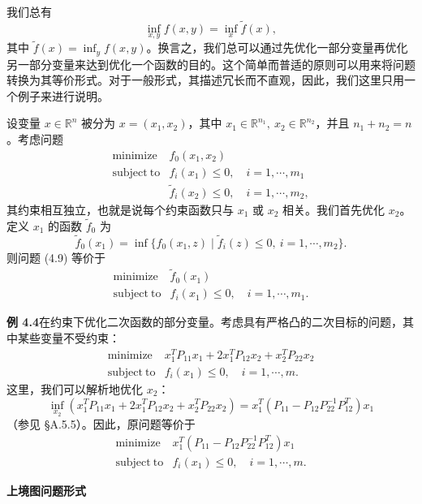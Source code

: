 \documentclass[UTF8,12pt,a4paper,fontset=fandol]{ctexart}
\begin{document}
我们总有
\[
\inf_{x,y} f(x,y)=\inf_x \tilde{f}(x),
\]
其中 $\tilde{f}(x)=\inf_y f(x,y)$。换言之，我们总可以通过先优化一部分变量再优化另一部分变量来达到优化一个函数的目的。这个简单而普适的原则可以用来将问题转换为其等价形式。对于一般形式，其描述冗长而不直观，因此，我们这里只用一个例子来进行说明。

设变量 $x\in\mathbb{R}^n$ 被分为 $x=(x_1,x_2)$，其中 $x_1\in\mathbb{R}^{n_1},\ x_2\in\mathbb{R}^{n_2}$，并且 $n_1+n_2=n$。考虑问题
\begin{equation}
\begin{array}{ll}
\mathop{\mathrm{minimize}} & f_0(x_1,x_2)\\
\mathrm{subject\ to} & f_i(x_1)\leq 0,\quad i=1,\cdots,m_1\\
& \tilde{f}_i(x_2)\leq 0,\quad i=1,\cdots,m_2,
\end{array}
\tag{4.9}
\end{equation}
其约束相互独立，也就是说每个约束函数只与 $x_1$ 或 $x_2$ 相关。我们首先优化 $x_2$。定义 $x_1$ 的函数 $\tilde{f}_0$ 为
\[
\tilde{f}_0(x_1)=\inf\{f_0(x_1,z)\mid \tilde{f}_i(z)\leq 0,\ i=1,\cdots,m_2\}.
\]
则问题 (4.9) 等价于
\begin{equation}
\begin{array}{ll}
\mathop{\mathrm{minimize}} & \tilde{f}_0(x_1)\\
\mathrm{subject\ to} & f_i(x_1)\leq 0,\quad i=1,\cdots,m_1.
\end{array}
\tag{4.10}
\end{equation}

\noindent\textbf{例 4.4}\quad 在约束下优化二次函数的部分变量。考虑具有严格凸的二次目标的问题，其中某些变量不受约束：
\[
\begin{array}{ll}
\mathop{\mathrm{minimize}} & x_1^T P_{11}x_1+2x_1^T P_{12}x_2+x_2^T P_{22}x_2\\
\mathrm{subject\ to} & f_i(x_1)\leq 0,\quad i=1,\cdots,m.
\end{array}
\]
这里，我们可以解析地优化 $x_2$：
\[
\inf_{x_2}\left(x_1^T P_{11}x_1+2x_1^T P_{12}x_2+x_2^T P_{22}x_2\right)
=x_1^T\left(P_{11}-P_{12}P_{22}^{-1}P_{12}^T\right)x_1
\]
（参见 §A.5.5）。因此，原问题等价于
\[
\begin{array}{ll}
\mathop{\mathrm{minimize}} & x_1^T\left(P_{11}-P_{12}P_{22}^{-1}P_{12}^T\right)x_1\\
\mathrm{subject\ to} & f_i(x_1)\leq 0,\quad i=1,\cdots,m.
\end{array}
\]

\noindent\textbf{上境图问题形式}
\end{document}
